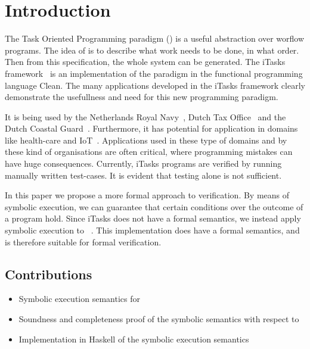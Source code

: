 


\section{Introduction}

The Task Oriented Programming paradigm (\TOP) is a useful abstraction over worflow programs.
The idea of \TOP is to describe what work needs to be done, in what order.
Then from this specification, the whole system can be generated.
The iTasks framework~\cite{DBLP:conf/ppdp/PlasmeijerLMAK12} is an implementation of the paradigm in the functional programming language Clean.
The many applications developed in the iTasks framework clearly demonstrate the usefullness and need for this new programming paradigm.

It is being used by the Netherlands Royal Navy~\cite{jansen2018dynamic}, Dutch Tax Office~\cite{conf/sfp/StutterheimAP17} and the Dutch Coastal Guard~\cite{lijnse2012incidone}. %
Furthermore, it has potential for application in domains like health-care and IoT~\cite{DBLP:conf/cgo/KoopmanLP18}.
Applications used in these type of domains and by these kind of organisations are often critical, where programming mistakes can have huge consequences.
Currently, iTasks programs are verified by running manually written test-cases. %
It is evident that testing alone is not sufficient.

In this paper we propose a more formal approach to verification.
By means of symbolic execution, we can guarantee that certain conditions over the outcome of a \TOP program hold.
Since iTasks does not have a formal semantics, we instead apply symbolic execution to \TOPHAT~\cite{Steenvoorden2019}.
This \TOP implementation does have a formal semantics, and is therefore suitable for formal verification.

\subsection{Contributions}

\begin{itemize}
  \item Symbolic execution semantics for \TOPHAT
  \item Soundness and completeness proof of the symbolic semantics with respect to \TOPHAT
  \item Implementation in Haskell of the symbolic execution semantics
\end{itemize}

